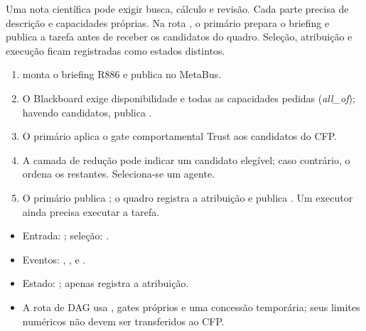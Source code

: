 
\begin{descricao}
Uma nota científica pode exigir busca, cálculo e revisão. Cada parte precisa
de descrição e capacidades próprias. Na rota , o primário
prepara o briefing e publica a tarefa antes de receber os candidatos do quadro.
Seleção, atribuição e execução ficam registradas como estados distintos.
\end{descricao}

\begin{processo}
\begin{enumerate}[leftmargin=1.4em,itemsep=1pt]
  \item {} monta o briefing R886 e publica  no MetaBus.
  \item O Blackboard exige disponibilidade e todas as capacidades pedidas
        (\emph{all\_of}); havendo candidatos, publica .
  \item O primário aplica o gate comportamental Trust aos candidatos do CFP.
  \item A camada de redução pode indicar um candidato elegível; caso contrário,
        o  ordena os restantes. Seleciona-se um agente.
  \item O primário publica ; o quadro registra a atribuição
        e publica . Um executor ainda precisa executar a tarefa.
\end{enumerate}
\end{processo}

\begin{arquitetura}
\begin{itemize}[leftmargin=1.3em,itemsep=1pt]
  \item Entrada: ; seleção: .
  \item Eventos: , ,  e .
  \item Estado: ;  apenas registra a atribuição.
  \item A rota de DAG usa , gates próprios e uma concessão
        temporária; seus limites numéricos não devem ser transferidos ao CFP.
\end{itemize}
\end{arquitetura}

